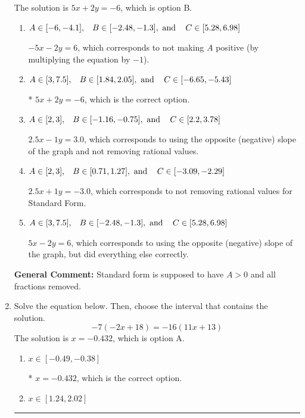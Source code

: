 \documentclass{extbook}[14pt]
\newcommand{\litem}[1]{\item #1

\rule{\textwidth}{0.4pt}}
\begin{document}
\begin{enumerate}
{The solution is \( 5x + 2y = -6 \), which is option B.\begin{enumerate}[label=\Alph*.]
\item \( A \in [-6, -4.1], \hspace{3mm} B \in [-2.48, -1.3], \text{ and } \hspace{3mm} C \in [5.28, 6.98] \)

 $-5x - 2y = 6$, which corresponds to not making $A$ positive (by multiplying the equation by $-1$).
\item \( A \in [3, 7.5], \hspace{3mm} B \in [1.84, 2.05], \text{ and } \hspace{3mm} C \in [-6.65, -5.43] \)

* $5x + 2y = -6$, which is the correct option.
\item \( A \in [2, 3], \hspace{3mm} B \in [-1.16, -0.75], \text{ and } \hspace{3mm} C \in [2.2, 3.78] \)

 $2.5x - 1y = 3.0$, which corresponds to using the opposite (negative) slope of the graph and not removing rational values.
\item \( A \in [2, 3], \hspace{3mm} B \in [0.71, 1.27], \text{ and } \hspace{3mm} C \in [-3.09, -2.29] \)

 $2.5x + 1y = -3.0$, which corresponds to not removing rational values for Standard Form.
\item \( A \in [3, 7.5], \hspace{3mm} B \in [-2.48, -1.3], \text{ and } \hspace{3mm} C \in [5.28, 6.98] \)

 $5x - 2y = 6$, which corresponds to using the opposite (negative) slope of the graph, but did everything else correctly.
\end{enumerate}

\textbf{General Comment:} Standard form is supposed to have $A > 0$ and all fractions removed.
}
\litem{
Solve the equation below. Then, choose the interval that contains the solution.
\[ -7(-2x + 18) = -16(11x + 13) \]The solution is \( x = -0.432 \), which is option A.\begin{enumerate}[label=\Alph*.]
\item \( x \in [-0.49, -0.38] \)

* $x = -0.432$, which is the correct option.
\item \( x \in [1.24, 2.02] \)


\end{enumerate}}
\end{enumerate}
\end{document}
